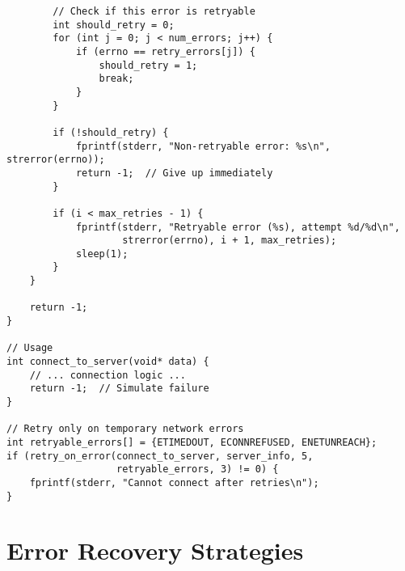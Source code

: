 \begin{lstlisting}
        // Check if this error is retryable
        int should_retry = 0;
        for (int j = 0; j < num_errors; j++) {
            if (errno == retry_errors[j]) {
                should_retry = 1;
                break;
            }
        }

        if (!should_retry) {
            fprintf(stderr, "Non-retryable error: %s\n", strerror(errno));
            return -1;  // Give up immediately
        }

        if (i < max_retries - 1) {
            fprintf(stderr, "Retryable error (%s), attempt %d/%d\n",
                    strerror(errno), i + 1, max_retries);
            sleep(1);
        }
    }

    return -1;
}

// Usage
int connect_to_server(void* data) {
    // ... connection logic ...
    return -1;  // Simulate failure
}

// Retry only on temporary network errors
int retryable_errors[] = {ETIMEDOUT, ECONNREFUSED, ENETUNREACH};
if (retry_on_error(connect_to_server, server_info, 5,
                   retryable_errors, 3) != 0) {
    fprintf(stderr, "Cannot connect after retries\n");
}
\end{lstlisting}

\section{Error Recovery Strategies}

